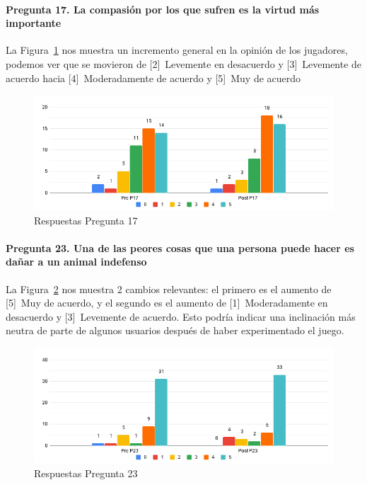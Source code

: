 \paragraph{Pregunta 17. La compasión por los que sufren es la virtud más importante}
La Figura~\ref{fig:chart-p17} nos muestra un incremento general en la opinión de los jugadores, podemos ver que se movieron de [2]~Levemente en desacuerdo y [3]~Levemente de acuerdo hacia [4]~Moderadamente de acuerdo y [5]~Muy de acuerdo

\begin{figure}[h]
    \centering
    \includegraphics[width=.9\textwidth]{imgs/chart-p17.png}
    \caption{Respuestas Pregunta 17}
    \label{fig:chart-p17}
\end{figure}

\paragraph{Pregunta 23. Una de las peores cosas que una persona puede hacer es dañar a un animal indefenso}
La Figura~\ref{fig:chart-p23} nos muestra 2 cambios relevantes: el primero es el aumento de [5]~Muy de acuerdo, y el segundo es el aumento de [1]~Moderadamente en desacuerdo y [3]~Levemente de acuerdo. Esto podría indicar una inclinación más neutra de parte de algunos usuarios después de haber experimentado el juego.

\begin{figure}[h]
    \centering
    \includegraphics[width=.9\textwidth]{imgs/chart-p23.png}
    \caption{Respuestas Pregunta 23}
    \label{fig:chart-p23}
\end{figure}

